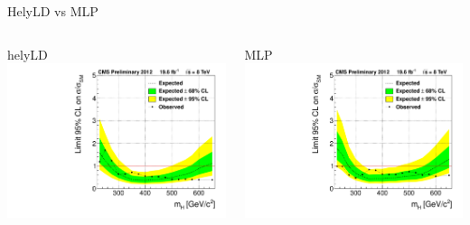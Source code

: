 \begin{frame}{HelyLD vs MLP}
\begin{center}
\scriptsize
\begin{columns}
  \begin{column}{0.5\textwidth}
    \begin{center}
    {\large helyLD}\\ 
    \vspace{.2em}
   \includegraphics[width=1.\textwidth]{images/8TeV_limit.pdf}
   \end{center}
  \end{column}
  \begin{column}{0.5\textwidth}
    \begin{center}
    {\large MLP}\\
    \vspace{.2em}
    \includegraphics[width=1.\textwidth]{images/MVA_limit.pdf}
    \end{center}
  \end{column}
\end{columns}


\end{center}
\end{frame}
